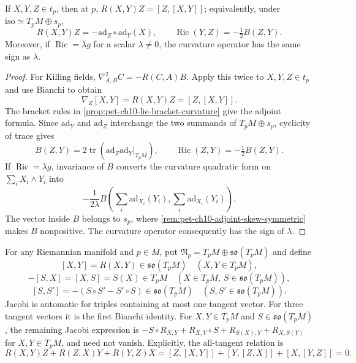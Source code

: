 \begin{theorem}
  \label{thm:pet-ch10-curvature-bracket-formula}
  If $X,Y,Z\in t_p$, then at $p$, $R(X,Y)Z=[Z,[X,Y]]$; equivalently, under
  $\mathrm{iso}\simeq T_pM\oplus s_p$,
  \[
    R(X,Y)Z=-\mathrm{ad}_Z\circ\mathrm{ad}_Y(X),
    \qquad
    \operatorname{Ric}(Y,Z)=-\tfrac12B(Z,Y).
  \]
  Moreover, if $\operatorname{Ric}=\lambda g$ for a scalar $\lambda\ne0$, the curvature
  operator has the same sign as $\lambda$.
\end{theorem}
\begin{proof}
  \sketch
  For Killing fields, $\nabla^2_{A,B}C=-R(C,A)B$. Apply this twice to
  $X,Y,Z\in t_p$ and use Bianchi to obtain
  \[
    \nabla_Z[X,Y]=R(X,Y)Z=[Z,[X,Y]].
  \]
  The bracket rules in \cref{prop:pet-ch10-lie-bracket-curvature} give the
  adjoint formula. Since $\mathrm{ad}_Y$ and $\mathrm{ad}_Z$ interchange the two
  summands of $T_pM\oplus s_p$, cyclicity of trace gives
  \[
    B(Z,Y)=2\operatorname{tr}
      (\mathrm{ad}_Z\mathrm{ad}_Y|_{T_pM}),
    \qquad \operatorname{Ric}(Z,Y)=-\tfrac12B(Z,Y).
  \]
  If $\operatorname{Ric}=\lambda g$, invariance of $B$ converts the curvature
  quadratic form on $\sum_iX_i\wedge Y_i$ into
  \[
    -\frac1{2\lambda}
    B\left(\sum_i\mathrm{ad}_{X_i}(Y_i),
            \sum_i\mathrm{ad}_{X_i}(Y_i)\right).
  \]
  The vector inside $B$ belongs to $s_p$, where
  \cref{rem:pet-ch10-adjoint-skew-symmetric} makes $B$ nonpositive. The
  curvature operator consequently has the sign of $\lambda$.
\end{proof}

\begin{definition}
  \label{def:pet-ch10-abstract-symmetric-bracket}
  For any Riemannian manifold and $p\in M$, put
  $\mathfrak N_p=T_pM\oplus\mathfrak{so}(T_pM)$ and define
  \[
    [X,Y]=R(X,Y)\in\mathfrak{so}(T_pM)\quad(X,Y\in T_pM),
  \]
  \[
    -[S,X]=[X,S]=S(X)\in T_pM\quad(X\in T_pM,\ S\in\mathfrak{so}(T_pM)),
  \]
  \[
    [S,S']=-(S\circ S'-S'\circ S)\in\mathfrak{so}(T_pM)\quad(S,S'\in\mathfrak{so}(T_pM)).
  \]
  Jacobi is automatic for triples containing at most one tangent vector. For
  three tangent vectors it is the first Bianchi identity. For $X,Y\in T_pM$
  and $S\in\mathfrak{so}(T_pM)$, the remaining Jacobi expression is
  $-S\circ R_{X,Y}+R_{X,Y}\circ S+R_{S(X),Y}+R_{X,S(Y)}$ for $X,Y\in T_pM$,
  and need not vanish. Explicitly, the all-tangent relation is
  \[
    R(X,Y)Z+R(Z,X)Y+R(Y,Z)X
    =[Z,[X,Y]]+[Y,[Z,X]]+[X,[Y,Z]]=0.
  \]
\end{definition}

